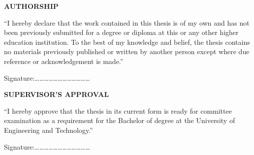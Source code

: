 \thispagestyle{plain}
\begin{center}
{\fontsize{13}{16}\selectfont\bfseries AUTHORSHIP}
\end{center}
\vspace{1em}

``I hereby declare that the work contained in this thesis is of my own and has not been
previously submitted for a degree or diploma at this or any other higher education
institution. To the best of my knowledge and belief, the thesis contains no materials
previously published or written by another person except where due reference or
acknowledgement is made.''

\vspace{3em}
\begin{flushright}
Signature:\ldots\ldots\ldots\ldots\ldots\ldots\ldots\ldots\ldots\ldots\ldots\ldots\\[0.5em]
\authorNameEn
\end{flushright}
\clearpage

\thispagestyle{plain}
\begin{center}
{\fontsize{13}{16}\selectfont\bfseries SUPERVISOR'S APPROVAL}
\end{center}
\vspace{1em}

``I hereby approve that the thesis in its current form is ready for committee examination
as a requirement for the Bachelor of \majorEn{} degree at the University of Engineering and
Technology.''

\vspace{3em}
\begin{flushright}
Signature:\ldots\ldots\ldots\ldots\ldots\ldots\ldots\ldots\ldots\ldots\ldots\ldots\\[0.5em]
\supervisorName
\end{flushright}
\clearpage
